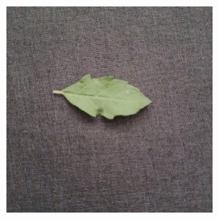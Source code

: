 \documentclass[twocolumn]{article}
\begin{document}
\begin{figure}[H]
\begin{subfigure}[b]{0.30\columnwidth}
    \end{subfigure}
    \hfill
    \begin{subfigure}[b]{0.30\columnwidth}
        \includegraphics[width=\textwidth]{tulsi6}
    \end{subfigure}
    \vspace{0.5em}
    

\end{figure}
\end{document}
